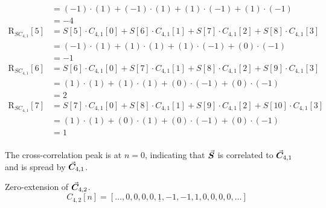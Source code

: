\begin{solution}
\begin{tasks}
{\begin{equation*}
\begin{split}
			&= (-1) \cdot (1) + (-1) \cdot (1) + (1) \cdot (-1) + (1) \cdot (-1) \\
			&= -4 \\
			\mathrm{R}_{SC_{4,1}}[5] &= S[5] \cdot C_{4,1}[0] + S[6] \cdot C_{4,1}[1] + S[7] \cdot C_{4,1}[2] + S[8] \cdot C_{4,1}[3] \\
			&= (-1) \cdot (1) + (1) \cdot (1) + (1) \cdot (-1) + (0) \cdot (-1) \\
			&= -1 \\
			\mathrm{R}_{SC_{4,1}}[6] &= S[6] \cdot C_{4,1}[0] + S[7] \cdot C_{4,1}[1] + S[8] \cdot C_{4,1}[2] + S[9] \cdot C_{4,1}[3] \\
			&= (1) \cdot (1) + (1) \cdot (1) + (0) \cdot (-1) + (0) \cdot (-1) \\
			&= 2 \\
			\mathrm{R}_{SC_{4,1}}[7] &= S[7] \cdot C_{4,1}[0] + S[8] \cdot C_{4,1}[1] + S[9] \cdot C_{4,1}[2] + S[10] \cdot C_{4,1}[3] \\
			&= (1) \cdot (1) + (0) \cdot (1) + (0) \cdot (-1) + (0) \cdot (-1) \\
			&= 1 \\
			\end{split}
			\end{equation*}
			
			The cross-correlation peak is at $n = 0$, indicating that $\vec{\bm{S}}$ is correlated to $\vec{\bm{C}}_{4,1}$ and is spread by $\vec{\bm{C}}_{4,1}$.
		}
	
		\task
		{
			\tiny
			Zero-extension of $\vec{\bm{C}}_{4,2}$.
			\begin{equation*}
				C_{4,2}[n] = \left[\ldots,0,0,0,0,\underline{1},-1,-1,1,0,0,0,0,\ldots\right]
			\end{equation*}
			
}
\end{tasks}
\end{solution}
